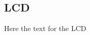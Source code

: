 \documentclass[../report.tex]{subfiles}
\begin{document}
\subsection{LCD}
Here the text for the LCD
\end{document}
